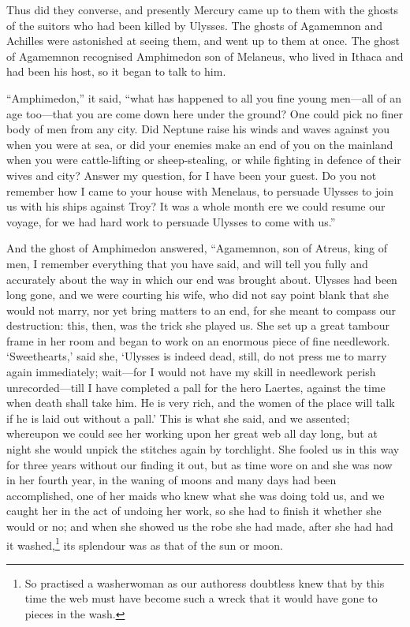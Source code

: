 Thus did they converse, and presently Mercury came up to them with the ghosts
of the suitors who had been killed by Ulysses. The ghosts of Agamemnon and
Achilles were astonished at seeing them, and went up to them at once. The ghost
of Agamemnon recognised Amphimedon son of Melaneus, who lived in Ithaca and had
been his host, so it began to talk to him.

“Amphimedon,” it said, “what has happened to all you fine young men—all of an
age too—that you are come down here under the ground? One could pick no finer
body of men from any city. Did Neptune raise his winds and waves against you
when you were at sea, or did your enemies make an end of you on the mainland
when you were cattle-lifting or sheep-stealing, or while fighting in defence of
their wives and city? Answer my question, for I have been your guest. Do you
not remember how I came to your house with Menelaus, to persuade Ulysses to
join us with his ships against Troy? It was a whole month ere we could resume
our voyage, for we had hard work to persuade Ulysses to come with us.”

And the ghost of Amphimedon answered, “Agamemnon, son of Atreus, king of men, I
remember everything that you have said, and will tell you fully and accurately
about the way in which our end was brought about. Ulysses had been long gone,
and we were courting his wife, who did not say point blank that she would not
marry, nor yet bring matters to an end, for she meant to compass our
destruction: this, then, was the trick she played us. She set up a great
tambour frame in her room and began to work on an enormous piece of fine
needlework. ‘Sweethearts,’ said she, ‘Ulysses is indeed dead, still, do not
press me to marry again immediately; wait—for I would not have my skill in
needlework perish unrecorded—till I have completed a pall for the hero Laertes,
against the time when death shall take him. He is very rich, and the women of
the place will talk if he is laid out without a pall.’ This is what she said,
and we assented; whereupon we could see her working upon her great web all day
long, but at night she would unpick the stitches again by torchlight. She
fooled us in this way for three years without our finding it out, but as time
wore on and she was now in her fourth year, in the waning of moons and many
days had been accomplished, one of her maids who knew what she was doing told
us, and we caught her in the act of undoing her work, so she had to finish it
whether she would or no; and when she showed us the robe she had made, after
she had had it washed,\footnote{So practised a washerwoman as our authoress doubtless knew that by this time
the web must have become such a wreck that it would have gone to pieces in the
wash.} its splendour was as that of the
sun or moon.

